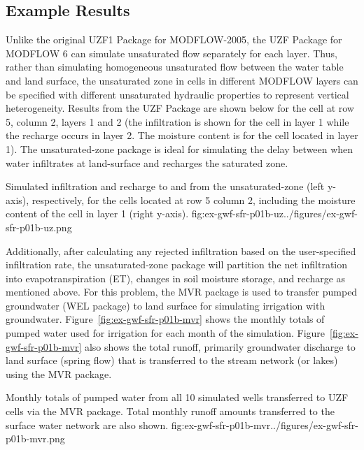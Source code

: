 \subsection{Example Results}

Unlike the original UZF1 Package \citep{UZF} for MODFLOW-2005, the UZF Package for MODFLOW 6 can simulate unsaturated flow separately for each layer. Thus, rather than simulating homogeneous unsaturated flow between the water table and land surface, the unsaturated zone in cells in different MODFLOW layers can be specified with different unsaturated hydraulic properties to represent vertical heterogeneity. Results from the UZF Package are shown below for the cell at row 5, column 2, layers 1 and 2 (the infiltration is shown for the cell in layer 1 while the recharge occurs in layer 2.  The moisture content is for the cell located in layer 1).  The unsaturated-zone package is ideal for simulating the delay between when water infiltrates at land-surface and recharges the saturated zone.  

\begin{StandardFigure}
	{Simulated infiltration and recharge to and from the unsaturated-zone (left y-axis), respectively, for the cells located at row 5 column 2, including the moisture content of the cell in layer 1 (right y-axis).}
	{fig:ex-gwf-sfr-p01b-uz}{../figures/ex-gwf-sfr-p01b-uz.png}
\end{StandardFigure}

Additionally, after calculating any rejected infiltration based on the user-specified infiltration rate, the unsaturated-zone package will partition the net infiltration into evapotranspiration (ET), changes in soil moisture storage, and recharge as mentioned above.  For this problem, the MVR package is used to transfer pumped groundwater (WEL package) to land surface for simulating irrigation with groundwater.  Figure~\ref{fig:ex-gwf-sfr-p01b-mvr} shows the monthly totals of pumped water used for irrigation for each month of the simulation.  Figure~\ref{fig:ex-gwf-sfr-p01b-mvr} also shows the total runoff, primarily groundwater discharge to land surface (spring flow) that is transferred to the stream network (or lakes) using the MVR package.

\begin{StandardFigure}
	{Monthly totals of pumped water from all 10 simulated wells transferred to UZF cells via the MVR package.  Total monthly runoff amounts transferred to the surface water network are also shown.}
	{fig:ex-gwf-sfr-p01b-mvr}{../figures/ex-gwf-sfr-p01b-mvr.png}
\end{StandardFigure}

